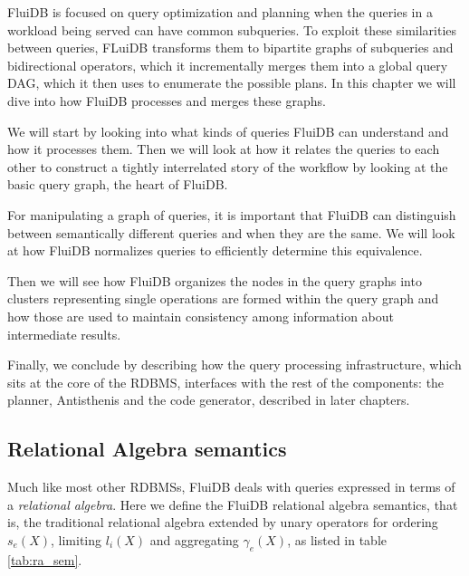 FluiDB is focused on query optimization and planning when the queries in a workload being served can have common subqueries.
To exploit these similarities between queries, FLuiDB transforms them to bipartite graphs of subqueries and bidirectional operators,
which it incrementally merges them into a global query DAG, which it then uses to enumerate the possible plans. 
In this chapter we will dive into how FluiDB processes and merges these graphs. 

We will start by looking into what kinds of queries FluiDB
can understand and how it processes them. Then we will look at how it relates
the queries to each other to construct a tightly interrelated story
of the workflow by looking at the basic query graph, the heart of
FluiDB. 

For manipulating a graph of queries, it is important that FluiDB can distinguish between semantically different queries and when they are the same.
We will look at how FluiDB normalizes queries to efficiently determine this equivalence. 

Then we will see how FluiDB organizes the nodes in the query graphs into  clusters representing single operations are formed within the query
graph and how those are used to maintain consistency among information about
intermediate results. 

Finally, we conclude by describing how the query
processing infrastructure, which sits at the core of the RDBMS,
interfaces with the rest of the components: the planner, Antisthenis
and the code generator, described in later chapters.

\subsection{Relational Algebra semantics}
\label{sec:relational_algebra_semantics}

Much like most other RDBMSs, FluiDB deals with queries expressed in
terms of a \emph{relational algebra}.  Here we define the
FluiDB relational algebra semantics, that is, the traditional relational
algebra extended by unary operators for ordering \(s_e(X)\), limiting
\(l_i(X)\) and aggregating \(\gamma_e(X)\), as listed in table \ref{tab:ra_sem}.

